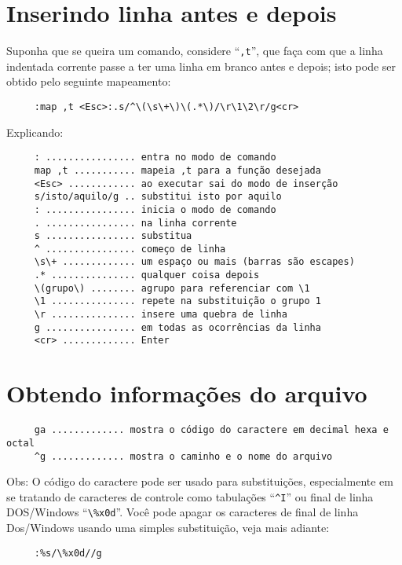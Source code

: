 \section{Inserindo linha antes e depois}

Suponha que se queira um comando, considere ``\verb|,t|'', que faça com que a
linha indentada corrente passe a ter uma linha em branco antes e depois; isto
pode ser obtido pelo seguinte mapeamento:

\begin{verbatim}
     :map ,t <Esc>:.s/^\(\s\+\)\(.*\)/\r\1\2\r/g<cr>
\end{verbatim}
     
Explicando:
     
\begin{verbatim}
     : ................ entra no modo de comando
     map ,t ........... mapeia ,t para a função desejada
     <Esc> ............ ao executar sai do modo de inserção
     s/isto/aquilo/g .. substitui isto por aquilo
     : ................ inicia o modo de comando
     . ................ na linha corrente
     s ................ substitua
     ^ ................ começo de linha
     \s\+ ............. um espaço ou mais (barras são escapes)
     .* ............... qualquer coisa depois
     \(grupo\) ........ agrupo para referenciar com \1
     \1 ............... repete na substituição o grupo 1
     \r ............... insere uma quebra de linha
     g ................ em todas as ocorrências da linha
     <cr> ............. Enter
\end{verbatim}

\section{Obtendo informações do arquivo}

\begin{verbatim}
     ga ............. mostra o código do caractere em decimal hexa e octal
     ^g ............. mostra o caminho e o nome do arquivo
\end{verbatim}

Obs: O código do caractere pode ser usado para substituições,
especialmente em se tratando de caracteres de controle como tabulações
``\verb|^I|'' ou final de linha DOS/Windows ``\verb|\%x0d|''. Você pode apagar os
caracteres de final de linha Dos/Windows usando uma simples
substituição, veja mais adiante:

\begin{verbatim}
     :%s/\%x0d//g
\end{verbatim}

